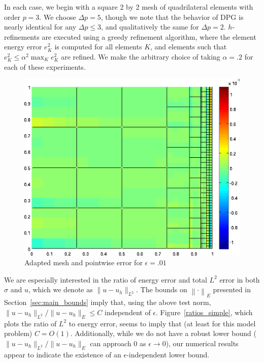 \documentclass[11pt,onecolumn]{scrartcl}
\newcommand{\nor}[1]{\left\| #1 \right\|}
\begin{document}
In each case, we begin with a square 2 by 2 mesh of quadrilateral elements with order $p=3$.  We choose $\Delta p = 5$, though we note that the behavior of DPG is nearly identical for any $\Delta p \leq 3$, and qualitatively the same for $\Delta p = 2$.  $h$-refinements are executed using a greedy refinement algorithm, where the element energy error $e_K^2$ is computed for all elements $K$, and elements such that $e_K^2 \leq \alpha^2 \max_K e_K^2$ are refined.  We make the arbitrary choice of taking $\alpha = .2$ for each of these experiments.  

\begin{figure}[h!]
\centering
\includegraphics[scale=.4]{figs/u_pointdiff_wallBC.png}
\caption{Adapted mesh and pointwise error for $\epsilon=.01$}
\end{figure}
We are especially interested in the ratio of energy error and total $L^2$ error in both $\sigma$ and $u$, which we denote as $\|u-u_h\|_{L^2}$.  The bounds on $\nor{\cdot}_E$ presented in Section~\ref{sec:main_bounds} imply that, using the above test norm, $\|u-u_h\|_{L^2} / \|u-u_h\|_E \leq C$ independent of $\epsilon$.  Figure~\ref{ratios_simple}, which plots the ratio of $L^2$ to energy error, seems to imply that (at least for this model problem) $C=O(1)$.  Additionally, while we do not have a robust lower bound ($\|u-u_h\|_{L^2} / \|u-u_h\|_E$ can approach $0$ as $\epsilon \rightarrow 0$), our numerical results appear to indicate the existence of an $\epsilon$-independent lower bound. 
\end{document}
